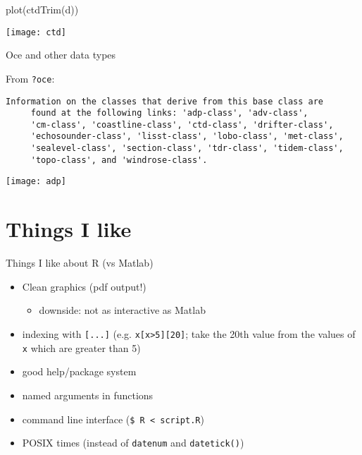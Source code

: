 \documentclass{beamer}
\begin{document}
\begin{frame}[fragile]
  
\begin{Schunk}
\begin{Sinput}
 plot(ctdTrim(d))
\end{Sinput}
\end{Schunk}
\begin{center}
  \texttt{[image: ctd]}
\end{center}

\end{frame}

\begin{frame}[fragile]{Oce and other data types}
  
  From \verb|?oce|:
\begin{verbatim}
Information on the classes that derive from this base class are
     found at the following links: 'adp-class', 'adv-class',
     'cm-class', 'coastline-class', 'ctd-class', 'drifter-class',
     'echosounder-class', 'lisst-class', 'lobo-class', 'met-class',
     'sealevel-class', 'section-class', 'tdr-class', 'tidem-class',
     'topo-class', and 'windrose-class'.
\end{verbatim}
  
\vspace{-1em}
\begin{center}
  \texttt{[image: adp]}
\end{center}

\end{frame}

\section{Things I like}

\begin{frame}[fragile]{Things I like about R (vs Matlab)}
  
  \begin{itemize}
  \item Clean graphics (pdf output!)
    \begin{itemize}
    \item downside: not as interactive as Matlab
    \end{itemize}
  \item indexing with \verb|[...]| (e.g. \verb|x[x>5][20]|; take the
    20th value from the values of \verb|x| which are greater than 5)
  \item good help/package system
  \item named arguments in functions
  \item command line interface (\verb|$ R < script.R|)
  \item POSIX times (instead of \verb|datenum| and \verb|datetick()|)
  \end{itemize}
  
\end{frame}
\end{document}
